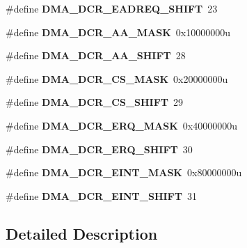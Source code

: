 \begin{DoxyCompactItemize}
\item 
\hypertarget{group___d_m_a___register___masks_gac11bbaa46006b670a6e2dcd34bd28dde}{}\#define {\bfseries D\+M\+A\+\_\+\+D\+C\+R\+\_\+\+E\+A\+D\+R\+E\+Q\+\_\+\+S\+H\+I\+F\+T}~23\label{group___d_m_a___register___masks_gac11bbaa46006b670a6e2dcd34bd28dde}

\item 
\hypertarget{group___d_m_a___register___masks_gaa6a92e7768984e640413eea5ef5da08b}{}\#define {\bfseries D\+M\+A\+\_\+\+D\+C\+R\+\_\+\+A\+A\+\_\+\+M\+A\+S\+K}~0x10000000u\label{group___d_m_a___register___masks_gaa6a92e7768984e640413eea5ef5da08b}

\item 
\hypertarget{group___d_m_a___register___masks_gafe71d9df8ce9ecf93c694cd325f50309}{}\#define {\bfseries D\+M\+A\+\_\+\+D\+C\+R\+\_\+\+A\+A\+\_\+\+S\+H\+I\+F\+T}~28\label{group___d_m_a___register___masks_gafe71d9df8ce9ecf93c694cd325f50309}

\item 
\hypertarget{group___d_m_a___register___masks_ga3c0beb03627ee2982c2fd1d332118d7f}{}\#define {\bfseries D\+M\+A\+\_\+\+D\+C\+R\+\_\+\+C\+S\+\_\+\+M\+A\+S\+K}~0x20000000u\label{group___d_m_a___register___masks_ga3c0beb03627ee2982c2fd1d332118d7f}

\item 
\hypertarget{group___d_m_a___register___masks_gaa453b5d53f87d5534ca546c4c6bef60f}{}\#define {\bfseries D\+M\+A\+\_\+\+D\+C\+R\+\_\+\+C\+S\+\_\+\+S\+H\+I\+F\+T}~29\label{group___d_m_a___register___masks_gaa453b5d53f87d5534ca546c4c6bef60f}

\item 
\hypertarget{group___d_m_a___register___masks_gaf7a7b51a343f7ce8a595f528aae583be}{}\#define {\bfseries D\+M\+A\+\_\+\+D\+C\+R\+\_\+\+E\+R\+Q\+\_\+\+M\+A\+S\+K}~0x40000000u\label{group___d_m_a___register___masks_gaf7a7b51a343f7ce8a595f528aae583be}

\item 
\hypertarget{group___d_m_a___register___masks_gafc3838d15550b818d421a160ea57a247}{}\#define {\bfseries D\+M\+A\+\_\+\+D\+C\+R\+\_\+\+E\+R\+Q\+\_\+\+S\+H\+I\+F\+T}~30\label{group___d_m_a___register___masks_gafc3838d15550b818d421a160ea57a247}

\item 
\hypertarget{group___d_m_a___register___masks_gac5427564104425fdb45a492386cf05e7}{}\#define {\bfseries D\+M\+A\+\_\+\+D\+C\+R\+\_\+\+E\+I\+N\+T\+\_\+\+M\+A\+S\+K}~0x80000000u\label{group___d_m_a___register___masks_gac5427564104425fdb45a492386cf05e7}

\item 
\hypertarget{group___d_m_a___register___masks_gaee74e1c480eec935c3864d892445db29}{}\#define {\bfseries D\+M\+A\+\_\+\+D\+C\+R\+\_\+\+E\+I\+N\+T\+\_\+\+S\+H\+I\+F\+T}~31\label{group___d_m_a___register___masks_gaee74e1c480eec935c3864d892445db29}

\end{DoxyCompactItemize}


\subsection{Detailed Description}
